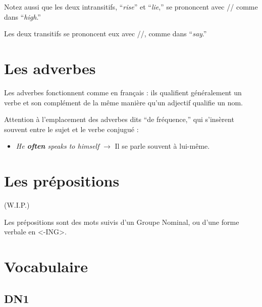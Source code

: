\documentclass[
  10pt,
]{article}
\providecommand{\tightlist}{%
  \setlength{\itemsep}{0pt}\setlength{\parskip}{0pt}}
\begin{document}
Notez aussi que les deux intransitifs, ``\emph{rise}'' et ``\emph{lie},'' se prononcent avec // comme
dans ``\emph{high}.''

Les deux transitifs se prononcent eux avec //, comme dans ``\emph{say}.''

\hypertarget{les-adverbes}{%
\section{Les adverbes}\label{les-adverbes}}

Les adverbes fonctionnent comme en français : ils qualifient généralement un verbe et son complément de la même manière qu'un adjectif qualifie un nom.

Attention à l'emplacement des adverbes dits ``de fréquence,'' qui s'insèrent souvent entre le sujet et le verbe conjugué :

\begin{itemize}
\tightlist
\item
  \emph{He \textbf{often} speaks to himself} \(\rightarrow\) Il se parle souvent à lui-même.
\end{itemize}

\hypertarget{les-pruxe9positions}{%
\section{Les prépositions}\label{les-pruxe9positions}}

(W.I.P.)

Les prépositions sont des mots suivis d'un Groupe Nominal, ou d'une forme verbale en \textless-ING\textgreater.

\hypertarget{vocabulaire}{%
\section{Vocabulaire}\label{vocabulaire}}

\hypertarget{dn1}{%
\subsection{DN1}\label{dn1}}
\end{document}
